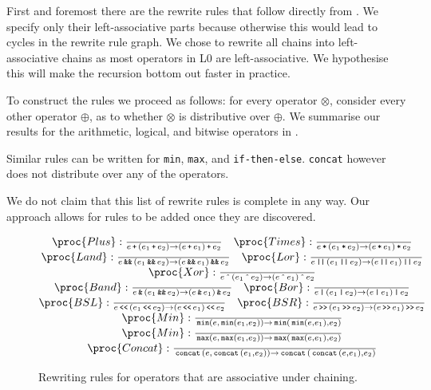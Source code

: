 First and foremost there are the rewrite rules that follow directly from
. We specify only their left-associative parts because
otherwise this would lead to cycles in the rewrite rule graph. We chose to
rewrite all chains into left-associative chains as most operators in L0 are
left-associative. We hypothesise this will make the recursion bottom out faster
in practice.

To construct the rules we proceed as follows: for every operator $\otimes$,
consider every other operator $\oplus$, as to whether $\otimes$ is distributive
over $\oplus$. We summarise our results for the arithmetic, logical, and
bitwise operators in .

Similar rules can be written for \texttt{min}, \texttt{max}, and
\texttt{if-then-else}. \texttt{concat} however does not distribute over any of
the operators.


We do not claim that this list of rewrite rules is complete in any way. Our
approach allows for rules to be added once they are discovered.

\begin{figure*}[htbp!]
\[
\begin{matrix}
\proc{Plus}:{\over
e \lp \p{e_1 \lp e_2} \rightarrow \p{ e \lp e_1} \lp e_2
}\quad
\proc{Times}:{\over
e \lt \p{e_1\lt e_2} \rightarrow \p{e \lt e_1} \lt e_2
}\\
\proc{Land}:{\over
e \LAND \p{e_1 \LAND e_2} \rightarrow \p{ e \LAND e_1} \LAND e_2
}\quad
\proc{Lor}:{\over
e \LOR \p{e_1\LOR e_2} \rightarrow \p{e \LOR e_1} \LOR e_2
}\\
\proc{Xor}:{\over
e \LBXOR \p{e_1 \LBXOR e_2} \rightarrow \p{ e \LBXOR e_1} \LBXOR e_2
}\\
\proc{Band}:{\over
e \LBAND \p{e_1 \LAND e_2} \rightarrow \p{ e \LBAND e_1} \LBAND e_2
}\quad
\proc{Bor}:{\over
e \LBOR \p{e_1\LBOR e_2} \rightarrow \p{e \LBOR e_1} \LBOR e_2
}\\
\proc{BSL}:{\over
e \LBSL \p{e_1 \LBSL e_2} \rightarrow \p{ e \LBSL e_1} \LBSL e_2
}\quad
\proc{BSR}:{\over
e \LBSR \p{e_1\LBSR e_2} \rightarrow \p{e \LBSR e_1} \LBSR e_2
}\\
\proc{Min}:{\over
\LMIN\p{e, \LMIN\p{e_1, e_2}} \rightarrow \LMIN\p{\LMIN\p{ e, e_1}, e_2}
}\\
\proc{Min}:{\over
\LMAX\p{e, \LMAX\p{e_1, e_2}} \rightarrow \LMAX\p{\LMAX\p{ e, e_1}, e_2}
}\\
\proc{Concat}:{\over
\LCONCAT\p{e, \LCONCAT\p{e_1, e_2}} \rightarrow \LCONCAT\p{\LCONCAT\p{ e, e_1}, e_2}
}\\
\end{matrix}
\]
\caption[]{Rewriting rules for operators that are associative under chaining.}
\label{figure:rewriting-chaining}
\end{figure*}

